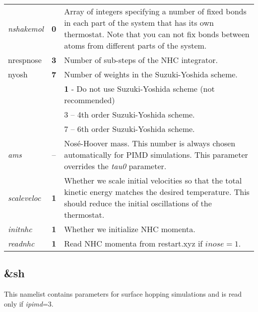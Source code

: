 \documentclass[12pt,a4paper]{article}
\begin{document}
\begin{tabular}{lcp{13cm}}
\textit{nshakemol} & \textbf{0} & Array of integers specifying a number of fixed bonds in each part of the system that has its own thermostat.
Note that you can not fix bonds between atoms from different parts of the system. \\

\colorbox{black!20}{nrespnose} & \textbf{3} & Number of sub-steps of the NHC integrator.\cite{Tuckerman_book} \\

\colorbox{black!20}{nyosh} & \textbf{7} & Number of weights in the Suzuki-Yoshida scheme.\cite{Tuckerman_book} \\
& & \textbf{1} - Do not use Suzuki-Yoshida scheme (not recommended) \\
& & 3 -- 4th order Suzuki-Yoshida scheme.\\
& & 7 -- 6th order Suzuki-Yoshida scheme.\\  

\colorbox{black!20}{\textit{ams}} & -- &  Nos\'{e}-Hoover mass.
This number is always chosen automatically for PIMD simulations.
This parameter overrides the \textit{tau0} parameter. \\

\colorbox{black!20}{\textit{scaleveloc}} & \textbf{1} & Whether we scale initial velocities so that the total kinetic energy
matches the desired temperature. This should reduce the initial oscillations of the thermostat. \\ 

\colorbox{black!20}{\textit{initnhc}} & \textbf{1} & Whether we initialize NHC momenta. \\ 

\colorbox{black!20}{\textit{readnhc}} & \textbf{1} & Read NHC momenta from restart.xyz if $inose=1$. \\ 

\end{tabular}



\newpage
\subsection{\&sh}
This namelist contains parameters for surface hopping simulations and is read only if \textit{ipimd}=3.
 
\end{document}
